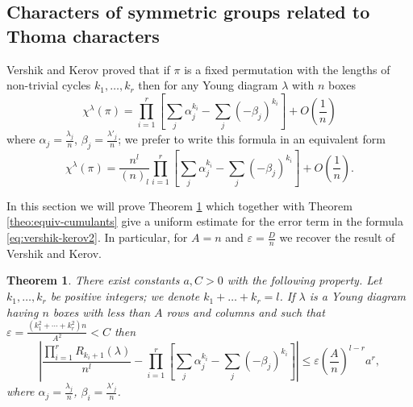 \documentclass[12pt]{amsart}
\theoremstyle{plain}
\newtheorem{theorem}[lemma]{Theorem}
\theoremstyle{remark}
\begin{document}
\subsection{Characters of symmetric groups related to Thoma characters}

Vershik and Kerov \cite{VershikKerov1981} proved that if 
$\pi$ is a fixed permutation with the lengths of non-trivial
cycles $k_1,\dots,k_r$
then for any Young diagram $\lambda$ with $n$ boxes
$$\chi^{\lambda}(\pi) =
\prod_{i=1}^r \left[ \sum_j
\alpha_j^{k_i} - \sum_j (-\beta_{j})^{k_i} \right] + O\left(\frac{1}{n}\right) 
$$
where $\alpha_j=\frac{\lambda_j}{n}$, $\beta_j=\frac{\lambda'_j}{n}$;
we prefer to write this formula in an equivalent form
\begin{equation}
\label{eq:vershik-kerov2}
\chi^{\lambda}(\pi) = \frac{n^l}{(n)_l}
\prod_{i=1}^r \left[ \sum_j
\alpha_j^{k_i} - \sum_j (-\beta_{j})^{k_i} \right] + O\left(\frac{1}{n}\right). 
\end{equation}

In this section we will prove Theorem \ref{theo:estimate-free} which together
with Theorem \ref{theo:equiv-cumulants} give a uniform estimate for
the error term in the formula \eqref{eq:vershik-kerov2}. In particular, for
$A=n$ and $\varepsilon = \frac{D}{n}$ we recover the result of Vershik and Kerov.


\begin{theorem}
\label{theo:estimate-free}
There exist constants $a,C>0$  with the following property.
Let $k_1,\dots,k_r$ be positive integers; we denote $k_1+\ldots+k_r=l$.
If $\lambda$ is a Young diagram having $n$ boxes with less than $A$ rows and
columns and such that
$\varepsilon=\frac{(k_1^2+\cdots+k_r^2) n}{A^2} < C$ then
\begin{equation}
\label{eq:freecumulants-estimate}
\left| \frac{\prod_{i=1}^r R_{k_i+1}(\lambda)}{n^l} - \prod_{i=1}^r \left[
\sum_j
\alpha_j^{k_i} - \sum_j (-\beta_{j})^{k_i} \right] \right|
\leq  \varepsilon \left(\frac{A}{n}\right)^{l-r} a^r,
\end{equation}
where $\alpha_j=\frac{\lambda_j}{n}$, $\beta_i=\frac{\lambda'_j}{n}$. 
\end{theorem}
\end{document}
